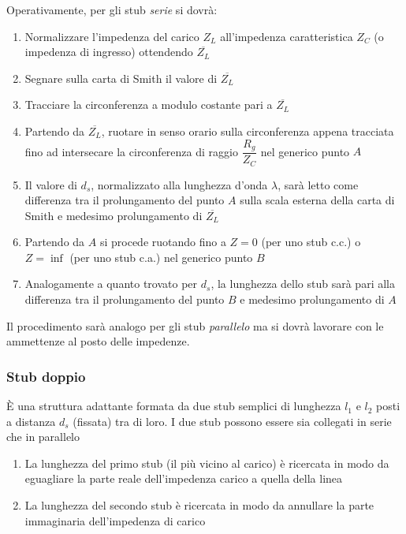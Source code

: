 \documentclass{article}
\begin{document}
Operativamente, per gli stub \textit{serie} si dovrà:
\begin{enumerate}
	\item Normalizzare l'impedenza del carico \(Z_L\) all'impedenza caratteristica \(Z_C\) (o impedenza di ingresso) ottendendo \(\overline{Z_L}\)
	\item Segnare sulla carta di Smith il valore di \( \overline{Z_L} \)
	\item Tracciare la circonferenza a modulo costante pari a \( \overline{Z_L} \)
	\item Partendo da \(\overline{Z_L}\), ruotare in senso orario sulla circonferenza appena tracciata fino ad intersecare la circonferenza di raggio \(\dfrac{R_g}{Z_C}\) nel generico punto \(A\)
	\item Il valore di \( d_s \), normalizzato alla lunghezza d'onda \( \lambda \), sarà letto come differenza tra il prolungamento del punto \(A\) sulla scala esterna della carta di Smith e medesimo prolungamento di \(\overline{Z_L}\)
	\item Partendo da \(A\) si procede ruotando fino a \(Z = 0\) (per uno stub c.c.) o \( Z = \inf \) (per uno stub c.a.) nel generico punto \(B\)
	\item Analogamente a quanto trovato per \( d_s \), la lunghezza dello stub sarà pari alla differenza tra il prolungamento del punto \(B\) e medesimo prolungamento di \(A\)  
\end{enumerate}
Il procedimento sarà analogo per gli stub \textit{parallelo} ma si dovrà lavorare con le ammettenze al posto delle impedenze.

\subsubsection{Stub doppio}
\`E una struttura adattante formata da due stub semplici di lunghezza \(l_1\) e \(l_2\) posti a distanza \(d_s\) (fissata) tra di loro. I due stub possono essere sia collegati in serie che in parallelo
\begin{enumerate}
	\item La lunghezza del primo stub (il più vicino al carico) è ricercata in modo da eguagliare la parte reale dell'impedenza carico a quella della linea
	\item La lunghezza del secondo stub è ricercata in modo da annullare la parte immaginaria dell'impedenza di carico
\end{enumerate}
\end{document}
